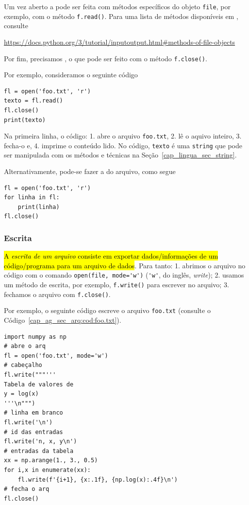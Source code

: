 Um vez aberto a  pode ser feita com métodos específicos do objeto {\lstinline+file+}, por exemplo, com o método {\lstinline+f.read()+}. Para uma lista de métodos disponíveis em {\python}, consulte
\begin{center}
  \url{https://docs.python.org/3/tutorial/inputoutput.html#methods-of-file-objects}
\end{center}
Por fim, precisamos , o que pode ser feito com o método {\lstinline+f.close()+}.

Por exemplo, consideramos o seguinte código

\begin{lstlisting}
fl = open('foo.txt', 'r')
texto = fl.read()
fl.close()
print(texto)
\end{lstlisting}

Na primeira linha, o código: 1. abre o arquivo \lstinline+foo.txt+, 2. lê o aquivo inteiro, 3. fecha-o e, 4. imprime o conteúdo lido. No código, \lstinline+texto+ é uma \lstinline+string+ que pode ser manipulada com os métodos e técnicas na Seção~\ref{cap_lingua_sec_string}.

Alternativamente, pode-se fazer a  do arquivo, como segue

\begin{lstlisting}
fl = open('foo.txt', 'r')
for linha in fl:
    print(linha)
fl.close()
\end{lstlisting}

\subsubsection{Escrita}

\hl{A \emph{escrita de um arquivo} consiste em exportar dados/informações de um código/programa para um arquivo de dados}. Para tanto: 1. abrimos o arquivo no código com o comando \lstinline+open(file, mode='w')+ (\lstinline+'w'+, do inglês, \textit{write}); 2. usamos um método de escrita, por exemplo, \lstinline+f.write()+ para escrever no arquivo; 3. fechamos o arquivo com \lstinline+f.close()+.

Por exemplo, o seguinte código escreve o arquivo \lstinline+foo.txt+ (consulte o Código~\ref{cap_ag_sec_arq:cod:foo.txt}).

\begin{lstlisting}[caption=foo.py, label=cap_ag_sec_arq:cod:foo.py]
import numpy as np
# abre o arq
fl = open('foo.txt', mode='w')
# cabeçalho
fl.write("""'''
Tabela de valores de
y = log(x)
'''\n""")
# linha em branco
fl.write('\n')
# id das entradas
fl.write('n, x, y\n')
# entradas da tabela
xx = np.arange(1., 3., 0.5)
for i,x in enumerate(xx):
    fl.write(f'{i+1}, {x:.1f}, {np.log(x):.4f}\n')
# fecha o arq
fl.close()
\end{lstlisting}

